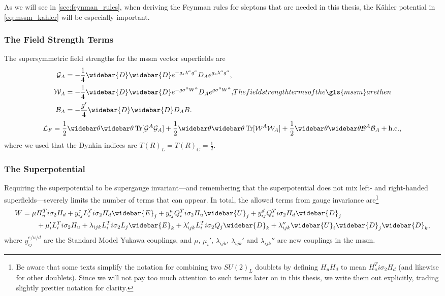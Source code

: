As we will see in \cref{sec:feynman_rules}, when deriving the Feynman rules for sleptons that are needed in this thesis, the K\"ahler potential in \cref{eq:mssm_kahler} will be especially important.


\subsubsection{The Field Strength Terms}
The supersymmetric field strengths for the \gls{mssm} vector superfields are
\begin{subequations}
\begin{align}
    \mathcal{G}_A &= -\frac{1}{4}\widebar{D}\widebar{D} e^{-g_s\lambda^a g^a} D_A e^{g_s\lambda^a g^a},
    \\
    \mathcal{W}_A &= -\frac{1}{4}\widebar{D}\widebar{D} e^{-g\sigma^a W^a} D_A e^{g\sigma^a W^a},
    \\
    \mathcal{B}_A &= -\frac{g'}{4}\widebar{D}\widebar{D} D_A B.
\end{align}
The field strength terms of the \gls{mssm} are then
\end{subequations}
\begin{equation}
    \mathcal{L}_F = \frac{1}{2} \thetabartwo \Tr[\mathcal{G}^A \mathcal{G}_A] + \frac{1}{2} \thetabartwo \Tr[\mathcal{W}^A \mathcal{W}_A] + \frac{1}{2} \thetabartwo \mathcal{B}^A \mathcal{B}_A + \text{h.c.},
\end{equation}
where we used that the Dynkin indices are $T(R)_L=T(R)_C=\frac{1}{2}$.


\subsubsection{The Superpotential}

Requiring the superpotential to be supergauge invariant---and remembering that the superpotential does not mix left- and right-handed superfields---severely limits the number of terms that can appear.
In total, the allowed terms from gauge invariance are\footnote{Be aware that some texts simplify the notation for combining two $SU(2)_L$ doublets by defining $H_uH_d$ to mean $H_u^Ti\sigma_2H_d$ (and likewise for other doublets). Since we will not pay too much attention to such terms later on in this thesis, we write them out explicitly, trading slightly prettier notation for clarity.}
\begin{equation}
\label{eq:mssm_superpotential_R_violated}
\begin{split}
    W &= \mu H_u^Ti\sigma_2H_d + y_{ij}^e L_i^Ti\sigma_2H_d\widebar{E}_j + y_{ij}^u Q_i^Ti\sigma_2H_u\widebar{U}_j + y_{ij}^d Q_i^Ti\sigma_2H_d\widebar{D}_j
    \\ &\qquad
    + \mu_i' L_i^Ti\sigma_2H_u + \lambda_{ijk} L_i^Ti\sigma_2L_j\widebar{E}_k + \lambda_{ijk}' L_i^Ti\sigma_2Q_j\widebar{D}_k + \lambda_{ijk}'' \widebar{U}_i\widebar{D}_j\widebar{D}_k,
\end{split}
\end{equation}
where $y_{ij}^{e/u/d}$ are the Standard Model Yukawa couplings, and $\mu$, $\mu_i'$, $\lambda_{ijk}$, $\lambda_{ijk}'$ and $\lambda_{ijk}''$ are new couplings in the \gls{mssm}.


